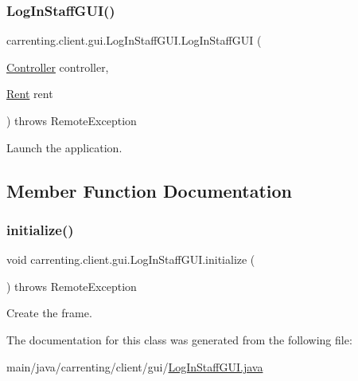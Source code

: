 \subsubsection{\texorpdfstring{LogInStaffGUI()}{LogInStaffGUI()}}
{\footnotesize\ttfamily carrenting.\+client.\+gui.\+Log\+In\+Staff\+G\+U\+I.\+Log\+In\+Staff\+G\+UI (\begin{DoxyParamCaption}\item[{\mbox{\hyperlink{classcarrenting_1_1client_1_1_controller}{Controller}}}]{controller,  }\item[{\mbox{\hyperlink{classcarrenting_1_1server_1_1jdo_1_1_rent}{Rent}}}]{rent }\end{DoxyParamCaption}) throws Remote\+Exception}

Launch the application. 

\subsection{Member Function Documentation}
\mbox{\label{classcarrenting_1_1client_1_1gui_1_1_log_in_staff_g_u_i_a47b35e476216e26fe89235fee12150e1}} 
\subsubsection{\texorpdfstring{initialize()}{initialize()}}
{\footnotesize\ttfamily void carrenting.\+client.\+gui.\+Log\+In\+Staff\+G\+U\+I.\+initialize (\begin{DoxyParamCaption}{ }\end{DoxyParamCaption}) throws Remote\+Exception}

Create the frame. 

The documentation for this class was generated from the following file\+:\begin{DoxyCompactItemize}
\item 
main/java/carrenting/client/gui/\mbox{\hyperlink{_log_in_staff_g_u_i_8java}{Log\+In\+Staff\+G\+U\+I.\+java}}\end{DoxyCompactItemize}
